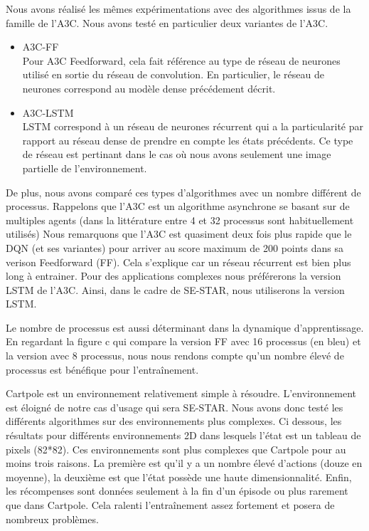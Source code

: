 Nous avons réalisé les mêmes expérimentations avec des algorithmes issus de la famille de l'A3C. Nous avons testé en particulier deux variantes de l'A3C.
\begin{itemize}
    \item A3C-FF \\
        Pour A3C Feedforward, cela fait référence au type de réseau de neurones utilisé en sortie du réseau de convolution. En particulier, le réseau de neurones correspond au modèle dense précédement décrit.
    \item A3C-LSTM \\
        LSTM correspond à un réseau de neurones récurrent qui a la particularité par rapport au réseau dense de prendre en compte les états précédents. Ce type de réseau est pertinant dans le cas où nous avons seulement une image partielle de l'environnement.
\end{itemize}
De plus, nous avons comparé ces types d'algorithmes avec un nombre différent de processus. Rappelons que l'A3C est un algorithme asynchrone se basant sur de multiples agents (dans la littérature entre 4 et 32 processus sont habituellement utilisés) 
Nous remarquons que l'A3C est quasiment deux fois plus rapide que le DQN (et ses variantes) pour arriver au score maximum de 200 points dans sa verison Feedforward (FF). Cela s'explique car un réseau récurrent est bien plus long à entrainer. Pour des applications complexes nous préférerons la version LSTM de l'A3C. Ainsi, dans le cadre de SE-STAR, nous utiliserons la version LSTM.

Le nombre de processus est aussi déterminant dans la dynamique d'apprentissage. En regardant la figure c qui compare la version FF avec 16 processus (en bleu) et la version avec 8 processus, nous nous rendons compte qu'un nombre élevé de processus est bénéfique pour l'entraînement.

Cartpole est un environnement relativement simple à résoudre. L'environnement est éloigné de notre cas d'usage qui sera SE-STAR. Nous avons donc testé les différents algorithmes sur des environnements plus complexes. 
Ci dessous, les résultats pour différents environnements 2D dans lesquels l'état est un tableau de pixels (82*82). Ces environnements sont plus complexes que Cartpole pour au moins trois raisons. 
La première est qu'il y a un nombre élevé d'actions (douze en moyenne), la deuxième est que l'état possède une haute dimensionnalité. Enfin, les récompenses sont données seulement à la fin d'un épisode ou  plus rarement que dans Cartpole. Cela ralenti l'entraînement assez fortement et posera de nombreux problèmes.  


